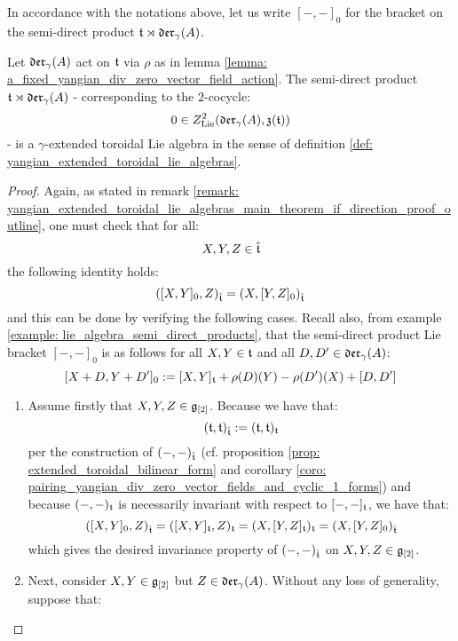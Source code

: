         In accordance with the notations above, let us write $[-, -]_0$ for the bracket on the semi-direct product $\mathfrak{t} \rtimes \mathfrak{der}_{\gamma}(A)$.
        \begin{lemma} \label{lemma: semi_direct_product_of_toroidal_lie_algebras_with_div_zero_vector_fields_are_yangian_extended_toroidal_lie_algebras}
            Let $\mathfrak{der}_{\gamma}(A)$ act on $\mathfrak{t}$ via $\rho$ as in lemma \ref{lemma: a_fixed_yangian_div_zero_vector_field_action}. The semi-direct product $\mathfrak{t} \rtimes \mathfrak{der}_{\gamma}(A)$ - corresponding to the $2$-cocycle:
                $$0 \in Z^2_{\mathrm{Lie}}(\mathfrak{der}_{\gamma}(A), \mathfrak{z}(\mathfrak{t}))$$
            - is a $\gamma$-extended toroidal Lie algebra in the sense of definition \ref{def: yangian_extended_toroidal_lie_algebras}.
        \end{lemma}
            \begin{proof}
                Again, as stated in remark \ref{remark: yangian_extended_toroidal_lie_algebras_main_theorem_if_direction_proof_outline}, one must check that for all:
                    $$X, Y, Z \in \hat{\mathfrak{t}}$$
                the following identity holds:
                    $$( [X, Y]_0, Z )_{\hat{\mathfrak{t}}} = ( X, [Y, Z]_0 )_{\hat{\mathfrak{t}}}$$
                and this can be done by verifying the following cases. Recall also, from example \ref{example: lie_algebra_semi_direct_products}, that the semi-direct product Lie bracket $[-, -]_0$ is as follows for all $X, Y \in \mathfrak{t}$ and all $D, D' \in \mathfrak{der}_{\gamma}(A)$:
                    $$[X + D, Y + D']_0 := [X, Y]_{\mathfrak{t}} + \rho(D)(Y) - \rho(D')(X) + [D, D']$$
                \begin{enumerate}
                    \item Assume firstly that $X, Y, Z \in \mathfrak{g}_{[2]}$. Because we have that:
                        $$(\mathfrak{t}, \mathfrak{t})_{\hat{\mathfrak{t}}} := (\mathfrak{t}, \mathfrak{t})_{\mathfrak{t}}$$
                    per the construction of $(-, -)_{\hat{\mathfrak{t}}}$ (cf. proposition \ref{prop: extended_toroidal_bilinear_form} and corollary \ref{coro: pairing_yangian_div_zero_vector_fields_and_cyclic_1_forms}) and because $(-, -)_{\mathfrak{t}}$ is necessarily invariant with respect to $[-, -]_{\mathfrak{t}}$, we have that:
                        $$( [X, Y]_0, Z )_{\hat{\mathfrak{t}}} = ( [X, Y]_{\mathfrak{t}}, Z )_{\mathfrak{t}} = ( X, [Y, Z]_{\mathfrak{t}} )_{\mathfrak{t}} = ( X, [Y, Z]_0 )_{\hat{\mathfrak{t}}}$$
                    which gives the desired invariance property of $(-, -)_{\hat{\mathfrak{t}}}$ on $X, Y, Z \in \mathfrak{g}_{[2]}$.
                    \item Next, consider $X, Y \in \mathfrak{g}_{[2]}$ but $Z \in \mathfrak{der}_{\gamma}(A)$. Without any loss of generality, suppose that:

\end{enumerate}
\end{proof}
